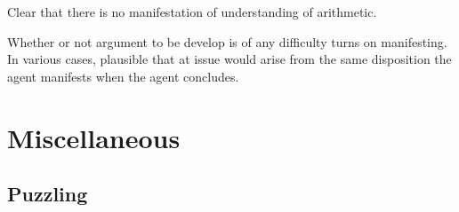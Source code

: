 \begin{note}[Illustration]
  Clear that there is no manifestation of understanding of arithmetic.
\end{note}

\begin{note}
  Whether or not argument to be develop is of any difficulty turns on manifesting.
  In various cases, plausible that  at issue would arise from the same disposition the agent manifests when the agent concludes.
\end{note}


\section{Miscellaneous}
\label{cha:lit:misc}


\subsection*{Puzzling}

